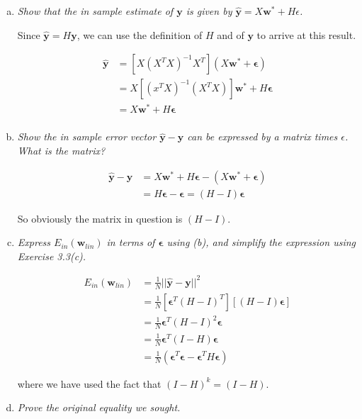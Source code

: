 \documentclass{article}
\renewcommand{\vec}[1]{\mathbf{#1}}
\begin{document}
\begin{enumerate}[(a)]
  \item \textit{Show that the in sample estimate of $\vec{y}$ is given by
    $\hat{\vec{y}} = X\vec{w}^* + H\epsilon$.}

    Since $\hat{\vec{y}} = H\vec{y}$, we can use the definition of $H$ and of $\vec{y}$ to 
    arrive at this result.

    \begin{align*}
      \hat{\vec{y}} &= [X(X^TX)^{-1}X^T](X\vec{w}^* + \vec{\epsilon}) \\
      &= X[(x^TX)^{-1}(X^TX)]\vec{w}^* + H\vec{\epsilon} \\
      &= X\vec{w}^* + H\vec{\epsilon} \\
    \end{align*}

  \item \textit{Show the in sample error vector $\hat{\vec{y}} - \vec{y}$ can be expressed by a
    matrix times $\epsilon$. What is the matrix?}

    \begin{align*}
      \hat{\vec{y}} - \vec{y} &= X\vec{w}^* + H\vec{\epsilon} - (X\vec{w}^* + \vec{\epsilon}) \\
      &= H\vec{\epsilon} - \vec{\epsilon} = (H - I)\vec{\epsilon}
    \end{align*}

    So obviously the matrix in question is $(H - I)$.

  \item \textit{Express $E_{in}(\vec{w}_{lin})$ in terms of $\vec{\epsilon}$ using (b), and
    simplify the expression using Exercise 3.3(c).}

    \begin{align*}
      E_{in}(\vec{w}_{lin}) &= \frac{1}{N} ||\hat{\vec{y}} - \vec{y}||^2 \\
      &= \frac{1}{N}[\vec{\epsilon}^T(H-I)^T][(H-I)\vec{\epsilon}] \\
      &= \frac{1}{N}\vec{\epsilon}^T(H-I)^2\vec{\epsilon} \\
      &= \frac{1}{N}\vec{\epsilon}^T(I-H)\vec{\epsilon} \\
      &= \frac{1}{N}(\vec{\epsilon}^T\vec{\epsilon} - \vec{\epsilon}^TH\vec{\epsilon})
    \end{align*}

    where we have used the fact that $(I-H)^k = (I-H)$.

  \item \textit{Prove the original equality we sought.}


\end{enumerate}
\end{document}
